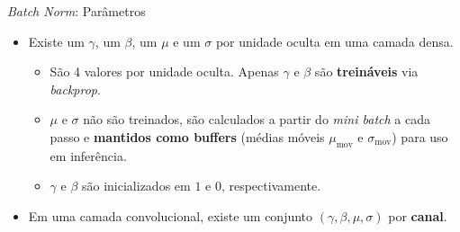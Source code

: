 \documentclass[aspectratio=169,xcolor=dvipsnames]{beamer}
\begin{document}
\begin{frame}{\textit{Batch Norm}: Parâmetros}
\begin{itemize}
    \item Existe um $\gamma$, um $\beta$, um $\mu$ e um $\sigma$ por unidade oculta em uma camada densa.
    \begin{itemize}
        \item São 4 valores por unidade oculta. Apenas $\gamma$ e $\beta$ são \textbf{treináveis} via \textit{backprop}.
        \item $\mu$ e $\sigma$ não são treinados, são calculados a partir do \textit{mini batch} a cada passo e \textbf{mantidos como buffers} (médias móveis $\mu_{\text{mov}}$ e $\sigma_{\text{mov}}$) para uso em inferência.
        \item $\gamma$ e $\beta$ são inicializados em $1$ e $0$, respectivamente.
    \end{itemize}
    \item Em uma camada convolucional, existe um conjunto $(\gamma, \beta, \mu, \sigma)$ por \textbf{canal}.
\end{itemize}
\end{frame}
\end{document}
